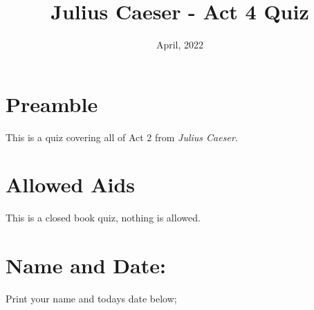 \documentclass[12pt]{article} %
\title{Julius Caeser - Act 4 Quiz}
\date{April, 2022}
\begin{document}
    \renewcommand*{\coursecode}{MCR3U Quiz} %
    \renewcommand*{\assgnnumber}{2} %
    \renewcommand*{\submdate}{January, 2022} %
    \renewcommand*{\studentfname}{\textbf{Name:}} %
    \renewcommand*{\studentlname}{} %

    \renewcommand\qedsymbol{$\blacksquare$}
    \setfigpath
    \pagestyle{crowdmark}
    \fancyhfoffset[L,O]{0pt} %




	\maketitle
	\section{Preamble}
    This is a quiz covering all of Act 2 from \textit{Julius Caeser}.
	\section{Allowed Aids}
  This is a closed book quiz, nothing is allowed.
	\section{Name and Date:}
	Print your name and todays date below;
\end{document}
